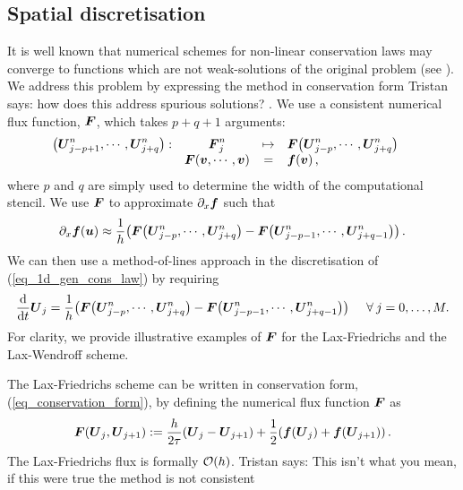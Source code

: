 \documentclass[final]{amsart}
\renewcommand{\dfunkmapstonumflux}[5]{\ensuremath{
		\begin{array}{rccl}
			{#1}: & {#2} &\mapsto&{#3}
			\\
			& {#4} &=&{#5}
		\end{array}\quad}}
\renewcommand{\vect}[1]{\geovec{#1}}
\renewcommand{\vec}[1]{\geovec{#1}}
\newcommand{\tristan}[1]{{\color{purple} Tristan says:  #1 }}
\numberwithin{equation}{section}
\begin{document}
\subsection{Spatial discretisation}
It is well known that numerical schemes for non-linear conservation
laws may converge to functions which are not weak-solutions of the
original problem (see \cite[\S12.1]{leveque1992numerical}). We address
this problem by expressing the method in conservation form
\tristan{how does this address spurious solutions?}. We use a
consistent numerical flux function, $\vec{F}$, which takes $p+q+1$
arguments:
\begin{equation}\label{eq_defn_num_flux}
\dfunkmapstonumflux{\qp{\vec{U}^n_{j-p+1},\cdots,\vec{U}^n_{j+q}}}{\vec{F}^n_j}{{\vec{F}}\qp{\vec{U}^n_{j-p},\cdots,\vec{U}^n_{j+q}}}{\vec{F}\qp{\vec{v},\cdots,\vec{v}}}{\vec{f}\qp{\vec{v}}, }
\end{equation}
where $p$ and $q$ are simply used to determine the width of the
computational stencil.  We use $\vec{F}$ to approximate
$\partial_{x}\vec{f}$ such that
\begin{equation}\label{eq_num_approx_f}
  \partial_{x}\vec{f}\qp{\vec{u}}\approx \frac{1}{h}\qp{{\vec{F}\qp{\vec{U}^n_{j-p},\cdots,\vec{U}^n_{j+q}}}-{\vec{F}\qp{\vec{U}^n_{j-p-1},\cdots,\vec{U}^n_{j+q-1}}}}.
\end{equation}
We can then use a method-of-lines approach in the discretisation of
(\ref{eq_1d_gen_cons_law}) by requiring
\begin{equation}\label{eq_conservation_form}
  \frac{\mathrm{d}}{\mathrm{d}t}\vec{U}_j =  \frac{1}{h}\qp{{\vec{F}\qp{\vec{U}^n_{j-p},\cdots,\vec{U}^n_{j+q}}}-{\vec{F}\qp{\vec{U}^n_{j-p-1},\cdots,\vec{U}^n_{j+q-1}}}} \Foreach j=0, \dots, M.
\end{equation}
For clarity, we provide illustrative examples of $\vec{F}$ for the
Lax-Friedrichs and the Lax-Wendroff scheme. 

\begin{Rem}
  The Lax-Friedrichs scheme can be written in conservation form,
  (\ref{eq_conservation_form}), by defining the numerical flux
  function $\vec{F}$ as
  \begin{equation}\label{eq_F_LxF_cons}
     \vect F\qp{ \vect U_j,  \vect U_{j+1}}
    :=
    \frac{h}{2\tau}\qp{ \vec U_j- \vec U_{j+1}}
    +
    \frac{1}{2}\qp{ \vec f\qp{ \vec U_j}+ \vec f\qp{\vect U_{j+1}}}.
  \end{equation}
  The Lax-Friedrichs flux is formally $\mathcal{O}\!\left({h}\right)$. \tristan{This isn't what you mean, if this were true the method is not consistent}
\end{Rem}
\end{document}
